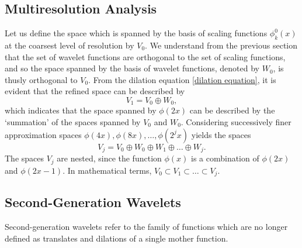 \documentclass[11pt]{article}
\begin{document}
\subsection{Multiresolution Analysis}
Let us define the space which is spanned by the basis of scaling functions $\phi_{k}^{0}(x)$ at the coarsest
level of resolution by $V_0$. We understand from the previous section that the set of wavelet functions are orthogonal 
to the set of scaling functions, and so the space spanned by the basis of wavelet functions, denoted by $W_0$, is thusly
orthogonal to $V_0$. From the dilation equation \ref{dilation equation}, it is evident that the refined space can be described
by
\begin{equation}
V_1 = V_0 \oplus W_0,
\end{equation}
which indicates that the space spanned by $\phi(2x)$ can be described by the `summation' of the spaces spanned by
$V_0$ and $W_0$. Considering successively finer approximation spaces $\phi(4x), \phi(8x), \dots, \phi(2^j x)$ yields 
the spaces
\begin{equation}
V_j = V_0 \oplus W_0 \oplus W_1 \oplus \dots \oplus W_j.
\end{equation}
The spaces $V_j$ are nested, since the function $\phi(x)$ is a combination of $\phi(2x)$ and $\phi(2x-1)$. In mathematical
terms, $V_0 \subset V_1 \subset \dots \subset V_j$.
\subsection{Second-Generation Wavelets}
Second-generation wavelets refer to the family of functions which are no longer defined as translates and dilations of 
a single mother function. 
\end{document}
